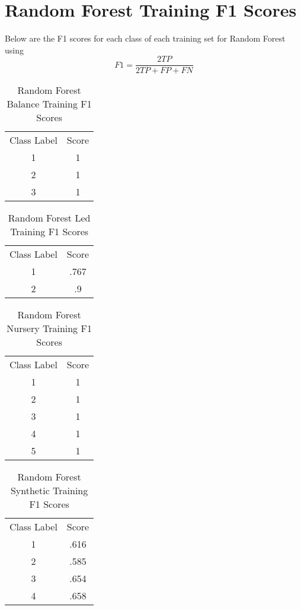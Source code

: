 \documentclass{article}
\begin{document}
\section*{Random Forest Training F1 Scores}
Below are the F1 scores for each class of each training set for Random Forest using $$F1 = \frac{2TP}{2TP + FP + FN}$$
\begin{table}[htbp]
\caption{Random Forest Balance Training F1 Scores}
\begin{tabular}{ |c|c| }
 \hline
 Class Label & Score\\
 1 & 1\\
 2 & 1\\
 3 & 1\\
 \hline
\end{tabular}
\end{table}
\begin{table}[htbp]
\caption{Random Forest Led Training F1 Scores}
\begin{tabular}{ |c|c| }
 \hline
 Class Label & Score\\
 1 & .767\\
 2 & .9\\
 \hline
\end{tabular}
\end{table}
\begin{table}[htbp]
\caption{Random Forest Nursery Training F1 Scores}
\begin{tabular}{ |c|c| }
 \hline
 Class Label & Score\\
 1 & 1\\
 2 & 1\\
 3 & 1\\
 4 & 1\\
 5 & 1\\
 \hline
\end{tabular}
\end{table}
\begin{table}[H]
\caption{Random Forest Synthetic Training F1 Scores}
\begin{tabular}{ |c|c| }
 \hline
 Class Label & Score\\
 1 & .616\\
 2 & .585\\
 3 & .654\\
 4 & .658\\
 \hline
\end{tabular}
\end{table}
\end{document}

